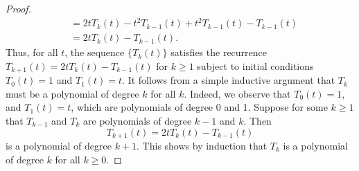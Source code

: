 \documentclass{homework}
\begin{document}
\begin{proof}
\begin{equation*}
\begin{aligned}
			&= 2tT_{k}(t) - t^2T_{k-1}(t) + t^2T_{k-1}(t) - T_{k-1}(t) \\
			&= 2tT_{k}(t) - T_{k-1}(t).
		\end{aligned}
		\end{equation*}
		Thus, for all $t$, the sequence $\{T_k(t)\}$ satisfies the recurrence $T_{k+1}(t) = 2tT_k(t) - T_{k-1}(t)$ for $k \ge 1$ subject to initial conditions $T_0(t) = 1$ and $T_1(t) = t$. It follows from a simple inductive argument that $T_k$ must be a polynomial of degree $k$ for all $k$. Indeed, we observe that $T_0(t) = 1$, and $T_1(t) = t$, which are polynomials of degree 0 and 1. Suppose for some $k \ge 1$ that $T_{k-1}$ and $T_{k}$ are polynomials of degree $k-1$ and $k$. Then
		\begin{equation*}
			T_{k+1}(t) = 2tT_k(t) - T_{k-1}(t)
		\end{equation*}
		is a polynomial of degree $k+1$. This shows by induction that $T_k$ is a polynomial of degree $k$ for all $k\ge 0$.
	\end{proof}
\end{document}

